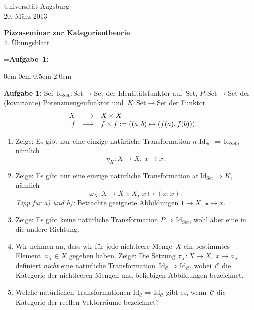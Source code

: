 \documentclass[a4paper,ngerman]{scrartcl}
\theoremstyle{definition}
\theoremstyle{plain}
\theoremstyle{remark}
\newcommand{\C}{\mathcal{C}}
\newcommand{\Set}{\mathrm{Set}}
\newcommand{\Id}{\mathrm{Id}}
\begin{document}
\vspace*{-4em}
\begin{flushright}Universität Augsburg \\ 20. März 2013\end{flushright}

\begin{center}\Large \textbf{Pizzaseminar zur Kategorientheorie} \\
4. Übungsblatt
\end{center}
\vspace{1.5em}

\newbox{\mybox}
\setbox\mybox=\hbox{\textbf{Aufgabe 1:}}

\begin{list}{}{0em \leftmargin0em \itemindent0.5em \itemsep 2.0em}
\item[\textbf{Aufgabe 1:}]
Sei~$\Id_\Set : \Set \to \Set$ der Identitätsfunktor auf~$\Set$, $P : \Set \to
\Set$ der (kovariante) Potenzmengenfunktor und~$K : \Set
\to \Set$ der Funktor
\[ \begin{array}{@{}rrcl@{}}
  & X &\longmapsto& X \times X \\
  & f &\longmapsto& f \times f := ((a,b) \mapsto (f(a),f(b))).
\end{array} \]
\begin{enumerate}
\item
Zeige: Es gibt nur eine einzige natürliche Transformation $\eta : \Id_\Set
\Rightarrow \Id_\Set$, nämlich
\[ \eta_X : X \to X,\ x \mapsto x. \]
\item
Zeige: Es gibt nur eine einzige natürliche Transformation $\omega : \Id_\Set
\Rightarrow K$, nämlich
\[ \omega_X : X \to X \times X,\ x \mapsto (x,x). \]
\emph{Tipp für a) und b):} Betrachte geeignete Abbildungen $1 \to X$, $\star
\mapsto x$.
\item
Zeige: Es gibt keine natürliche Transformation $P \Rightarrow \Id_\Set$, wohl
aber eine in die andere Richtung.
\item Wir nehmen an, dass wir für jede nichtleere Menge~$X$ ein bestimmtes
Element~$a_X \in X$ gegeben haben. Zeige:
Die Setzung
$\tau_X : X \to X,\ x \mapsto a_X$
definiert \emph{nicht} eine natürliche Transformation~$\Id_\C \Rightarrow \Id_\C$,
wobei~$\C$ die Kategorie der nichtleeren Mengen und beliebigen Abbildungen
bezeichnet.
\item
Welche natürlichen Transformationen $\Id_\C \Rightarrow \Id_\C$ gibt es,
wenn~$\C$ die Kategorie der reellen Vektorräume bezeichnet?
\end{enumerate}


\end{list}
\end{document}

